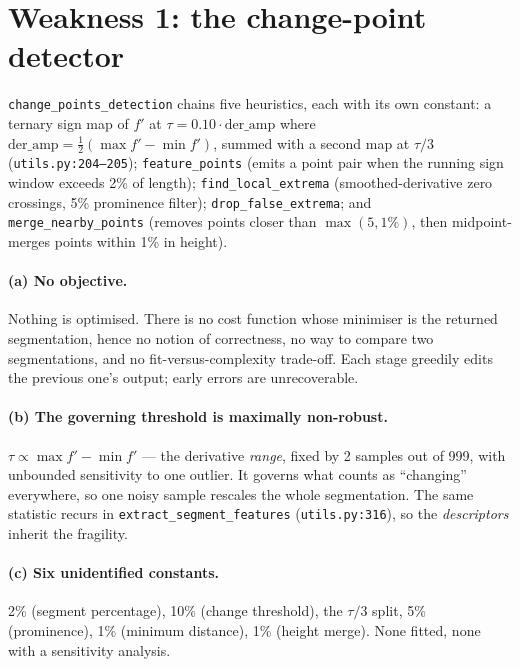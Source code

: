 \documentclass[11pt]{article}
\newcommand{\code}[1]{\texttt{\small #1}}
\begin{document}
\section{Weakness 1: the change-point detector}
\label{sec:cpd}
\code{change\_points\_detection} chains five heuristics, each with its own constant:
a ternary sign map of $f'$ at $\tau = 0.10\cdot\mathrm{der\_amp}$ where
$\mathrm{der\_amp} = \tfrac12(\max f' - \min f')$, summed with a second map at $\tau/3$
(\code{utils.py:204--205}); \code{feature\_points} (emits a point pair when the running sign
window exceeds 2\% of length); \code{find\_local\_extrema} (smoothed-derivative zero
crossings, 5\% prominence filter); \code{drop\_false\_extrema}; and
\code{merge\_nearby\_points} (removes points closer than $\max(5,1\%)$, then midpoint-merges
points within 1\% in height).

\paragraph{(a) No objective.} Nothing is optimised. There is no cost function whose minimiser
is the returned segmentation, hence no notion of correctness, no way to compare two
segmentations, and no fit-versus-complexity trade-off. Each stage greedily edits the previous
one's output; early errors are unrecoverable.

\paragraph{(b) The governing threshold is maximally non-robust.} $\tau \propto \max f' - \min
f'$ --- the derivative \emph{range}, fixed by 2 samples out of 999, with unbounded
sensitivity to one outlier. It governs what counts as ``changing'' everywhere, so one noisy
sample rescales the whole segmentation. The same statistic recurs in
\code{extract\_segment\_features} (\code{utils.py:316}), so the \emph{descriptors} inherit
the fragility.

\paragraph{(c) Six unidentified constants.} 2\% (segment percentage), 10\% (change
threshold), the $\tau/3$ split, 5\% (prominence), 1\% (minimum distance), 1\% (height merge).
None fitted, none with a sensitivity analysis.
\end{document}
